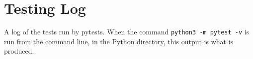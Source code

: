 \chapter{Testing Log}

A log of the tests run by pytests. When the command \verb|python3 -m pytest -v| is run from the command line, in the Python directory, this output is what is produced.

\lstset{basicstyle=\footnotesize, numbers = left}
